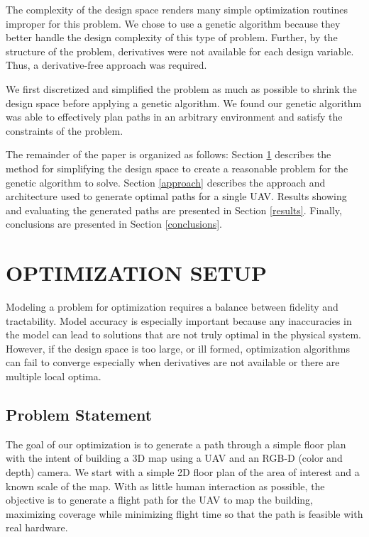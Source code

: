 \documentclass[letterpaper, 10 pt, conference]{ieeeconf}  %
\begin{document}
The complexity of the design space renders many simple optimization routines improper for this problem. We chose to use a genetic algorithm because they better handle the design complexity of this type of problem. Further, by the structure of the problem, derivatives were not available for each design variable. Thus, a derivative-free approach was required.

We first discretized and simplified the problem as much as possible to shrink the design space before applying a genetic algorithm. We found our genetic algorithm was able to effectively plan paths in an arbitrary environment and satisfy the constraints of the problem.

The remainder of the paper is organized as follows: Section \ref{setup} describes the method for simplifying the design space to create a reasonable problem for the genetic algorithm to solve. Section \ref{approach} describes the approach and architecture used to generate optimal paths for a single UAV.
Results showing and evaluating the generated paths are presented in Section \ref{results}. Finally, conclusions are presented in Section \ref{conclusions}.

\section{OPTIMIZATION SETUP}\label{setup}


Modeling a problem for optimization requires a balance between fidelity and tractability. Model accuracy is especially important because any inaccuracies in the model can lead to solutions that are not truly optimal in the physical system. However, if the design space is too large, or ill formed, optimization algorithms can fail to converge especially when derivatives are not available or there are multiple local optima.

\subsection{Problem Statement}

The goal of our optimization is to generate a path through a simple floor plan with the intent of building a 3D map using a UAV and an RGB-D (color and depth) camera. We start with a simple 2D floor plan of the area of interest and a known scale of the map. With as little human interaction as possible, the objective is to generate a flight path for the UAV to map the building, maximizing coverage while minimizing flight time so that the path is feasible with real hardware.
\end{document}
